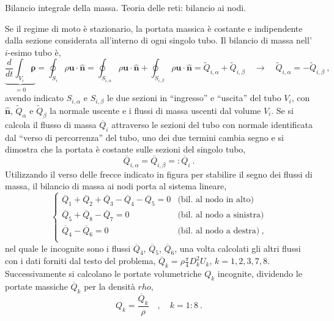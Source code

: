 \sol

\partone
Bilancio integrale della massa. Teoria delle reti: bilancio ai nodi.

\parttwo
Se il regime di moto è stazionario, la portata massica è costante e indipendente dalla sezione considerata all'interno di ogni singolo tubo. Il bilancio di massa nell'$i$-esimo tubo è,
\begin{equation}
 \underbrace{\dfrac{d}{dt} \int_{V_i} \bm{\rho}}_{=0} = \oint_{S_i} \rho \bm{u} \cdot \bm{\hat{n}} = \oint_{S_{i,{\alpha}}}\rho \bm{u} \cdot \bm{\hat{n}} + \oint_{S_{i,\beta}} \rho \bm{u} \cdot \bm{\hat{n}} = \tilde{Q}_{i,\alpha} + \tilde{Q}_{i,\beta} \quad \rightarrow \quad \tilde{Q}_{i,\alpha} = -  \tilde{Q}_{i,\beta} \ , 
\end{equation}
avendo indicato $S_{i,{\alpha}}$ e $S_{i,{\beta}}$ le due sezioni in ``ingresso'' e ``uscita'' del tubo $V_i$, con $\bm{\hat{n}}$, $\tilde{Q}_{\alpha}$ e $\tilde{Q}_{\beta}$ la normale uscente e i flussi di massa uscenti dal volume $V_i$. Se si calcola il flusso di massa $\overline{Q}_i$ attraverso le sezioni del tubo con normale identificata dal ``verso di percorrenza'' del tubo, uno dei due termini cambia segno e si dimostra che la portata è costante sulle sezioni del singolo tubo, 
\begin{equation}
 \overline{Q}_{i,\alpha} = \overline{Q}_{i,\beta} =: \overline{Q}_{i} \ .
\end{equation}
%
Utilizzando il verso delle frecce indicato in figura per stabilire il segno dei flussi di massa, il bilancio di massa ai nodi porta al sistema lineare,
\begin{equation}
 \begin{cases}
   \overline{Q}_1 + \overline{Q}_2 + \overline{Q}_3 - \overline{Q}_4 - \overline{Q}_5 = 0 & \text{(bil. al nodo in alto)} \\
   \overline{Q}_5 + \overline{Q}_8 - \overline{Q}_7 = 0 & \text{(bil. al nodo a sinistra)} \\
   \overline{Q}_4 - \overline{Q}_6 = 0 & \text{(bil. al nodo a destra)} \ , \\
 \end{cases}
\end{equation}
nel quale le incognite sono i flussi $\overline{Q}_4$, $\overline{Q}_5$, $\overline{Q}_6$, una volta calcolati gli altri flussi con i dati forniti dal testo del problema,
$\overline{Q}_k = \rho \frac{\pi}{4}D_k^2 U_k$, $k=1,2,3,7,8$.
%
Successivamente si calcolano le portate volumetriche $Q_k$ incognite, dividendo le portate massiche $\overline{Q}_k$ per la densità $rho$,
\begin{equation}
 Q_k = \dfrac{\overline{Q}_k}{\rho} \quad , \quad k = 1:8 \ .
\end{equation}

